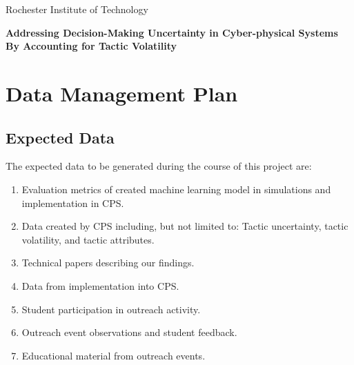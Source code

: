 \documentclass[11pt]{article}
\begin{document}
\renewcommand{\thepage}{DMP-\arabic{page}}
\setcounter{page}{1}

\def\myskip{3ex}

\centerline{\normalsize Rochester Institute of Technology}
\vspace{4 mm}
\centerline{\normalsize\bf Addressing Decision-Making Uncertainty in Cyber-physical Systems By Accounting for Tactic Volatility}


\section*{Data Management Plan}

\subsection*{Expected Data}

The expected data to be generated during the course of this project are:

\begin{enumerate}[noitemsep]

  \item Evaluation metrics of created machine learning model in simulations and implementation in CPS.
  \item Data created by CPS including, but not limited to: Tactic uncertainty, tactic volatility, and tactic attributes.
  \item Technical papers describing our findings.
  \item Data from implementation into CPS.
  \item Student participation in outreach activity.
  \item Outreach event observations and student feedback.
  \item Educational material from outreach events.
  
\end{enumerate}
\end{document}
